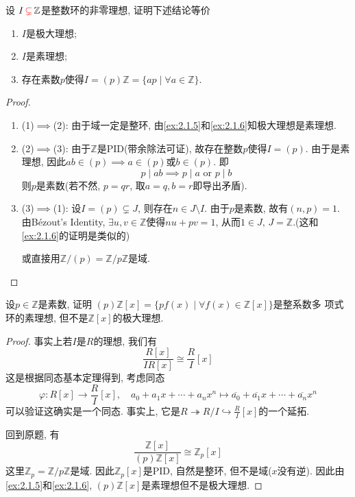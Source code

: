 \begin{problem}
    设 $I \,\textcolor{red}{\subsetneq}\, \mathbb{Z}$是整数环的非零理想, 证明下述结论等价
\begin{enumerate}[(1)]
    \item $I$是极大理想;
    \item $I$是素理想;
    \item 存在素数$p$使得$I = (p)\mathbb{Z} = \{ap \mid \forall a \in \mathbb{Z}\}$.
\end{enumerate}
\end{problem}

\begin{proof}
    \begin{enumerate}[1.]
        \item (1)$\implies$(2): 由于域一定是整环, 由\ref{ex:2.1.5}和\ref{ex:2.1.6}知极大理想是素理想.
        \item (2)$\implies$(3): 由于$\mathbb{Z}$是PID(带余除法可证), 故存在整数$p$使得$I = (p)$. 由于是素理想, 因此$ab \in (p) \implies a \in (p)$或$b \in (p)$. 即
        \[
            p \mid ab \implies p \mid a \text{ or } p \mid b
        \]
        则$p$是素数(若不然, $p = qr$, 取$a = q, b = r$即导出矛盾).
        \item (3)$\implies$(1): 设$I = (p) \subsetneq J$, 则存在$n \in J \setminus I$. 由于$p$是素数, 故有$(n, p) = 1$. 由Bézout's Identity, $\exists u, v \in \mathbb{Z}$使得$nu + pv = 1$, 从而$1 \in J,\, J = \mathbb{Z}$.(这和\ref{ex:2.1.6}的证明是类似的)
        
        或直接用$\mathbb{Z}/(p) = \mathbb{Z}/p\mathbb{Z}$是域.
    \end{enumerate}
\end{proof}

\begin{problem}\label{ex:2.1.8}
    设$p \in \mathbb{Z}$是素数, 证明
$(p)\mathbb{Z}[x] = \{pf(x) \mid \forall f(x) \in \mathbb{Z}[x]\}$是整系数多
项式环的素理想, 但不是$\mathbb{Z}[x]$的极大理想.
\end{problem}

\begin{proof}
    事实上若$I$是$R$的理想, 我们有
\[
    \frac{R[x]}{IR[x]} \cong \frac{R}{I}[x]
\]
这是根据同态基本定理得到, 考虑同态
\[
    \varphi: R[x] \to \frac{R}{I}[x],\quad a_0 + a_1x + \cdots + a_nx^n \mapsto \overline{a_0} + \overline{a_1}x + \cdots + \overline{a_n}x^n
\]
可以验证这确实是一个同态. 事实上, 它是$R \twoheadrightarrow R/I \hookrightarrow \frac{R}{I}[x]$的一个延拓.

回到原题, 有
\[
    \frac{\mathbb{Z}[x]}{(p)\mathbb{Z}[x]} \cong \mathbb{Z}_p[x]
\]
这里$\mathbb{Z}_p = \mathbb{Z}/p\mathbb{Z}$是域. 因此$\mathbb{Z}_p[x]$是PID, 自然是整环, 但不是域($x$没有逆). 因此由\ref{ex:2.1.5}和\ref{ex:2.1.6}, $(p)\mathbb{Z}[x]$是素理想但不是极大理想.
\end{proof}

